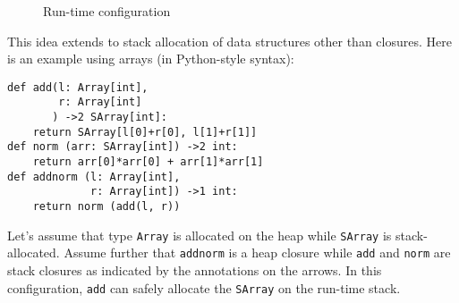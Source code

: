\documentclass[sigplan,review,dvipsnames,screen,10pt]{acmart}
\begin{document}
\begin{figure}[tp]
\caption{Run-time configuration}
  \label{fig:runtime-configuration}
\end{figure}
This idea extends to stack allocation of data structures
other than closures. Here is an example using arrays (in Python-style syntax):
\begin{lstlisting}
def add(l: Array[int],
        r: Array[int]
       ) ->2 SArray[int]:
    return SArray[l[0]+r[0], l[1]+r[1]]
def norm (arr: SArray[int]) ->2 int:
    return arr[0]*arr[0] + arr[1]*arr[1]
def addnorm (l: Array[int],
             r: Array[int]) ->1 int:
    return norm (add(l, r))
\end{lstlisting}
Let's assume that type \texttt{Array} is
allocated on the heap while \texttt{SArray} is stack-allocated.
Assume further that \texttt{addnorm} is a heap closure while \texttt{add}
and \texttt{norm} are stack closures as indicated by the annotations
on the arrows.
In this configuration, \texttt{add} can safely allocate the
\texttt{SArray} on the run-time stack.
\end{document}

